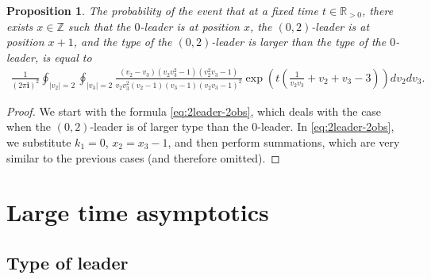 \documentclass[11pt,reqno]{amsart}
\newtheorem{prop}[thm]{Proposition}
\theoremstyle{definition}
\theoremstyle{remark}
\theoremstyle{remark}
\def\Z{\mathbb Z}
\def\R{\mathbb R}
\newcommand{\ii}{{\mathbf i}}
\numberwithin{equation}{section}
\begin{document}
	\begin{prop}
		\label{prop:number-changes-formula}
		The probability of the event that at a fixed time $t \in \R_{>0}$, there exists $x \in \Z$ such that the $0$-leader is at position $x$, the $(0,2)$-leader is at position $x+1$, and the type of the $(0,2)$-leader is larger than the type of the $0$-leader, is equal to 
		\begin{multline}
			\label{eq:number-changes-formula}
			\frac{1}{(2 \pi \ii)^2} \oint_{|v_2|=2} \oint_{|v_3|=2} \frac{(v_2-v_3)(v_2 v_3^2-1)(v_2^2 v_3-1)}{v_2 v_3^2 (v_2-1) (v_3-1)(v_2 v_3-1)^2}
			\exp \left( t \left( \frac{1}{v_2 v_3}+v_2+v_3 - 3 \right) \right) dv_2 dv_3.
		\end{multline}
	\end{prop}
	
	\begin{proof}
		We start with the formula \eqref{eq:2leader-2obs}, which deals with the case when the $(0,2)$-leader is of larger type than the $0$-leader. In \eqref{eq:2leader-2obs}, we substitute $k_1=0$, $x_2=x_3-1$, and then perform summations, which are very similar to the previous cases (and therefore omitted). 
	\end{proof}
	
	
	\section{Large time asymptotics}
	
	\subsection{Type of leader}
	\label{sec:5-1}
	
\end{document}
